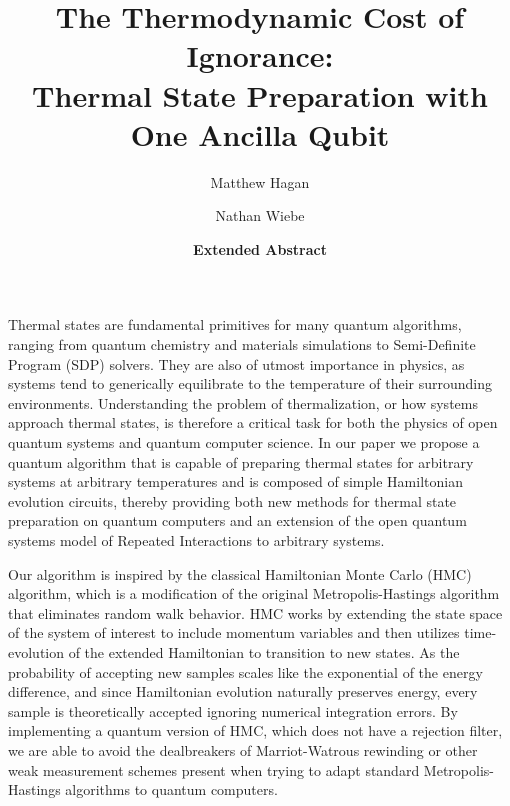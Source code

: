 \documentclass[11pt]{article}
\newcommand{\bigotilde}[1]{\widetilde{O} \left( #1 \right)}
\begin{document}
\title{The Thermodynamic Cost of Ignorance:\\ Thermal State Preparation with One Ancilla Qubit}

\author[1]{Matthew Hagan}
\author[1]{Nathan Wiebe}

\date{\textbf{Extended Abstract}}
\maketitle
Thermal states are fundamental primitives for many quantum algorithms, ranging from quantum chemistry and materials simulations to Semi-Definite Program (SDP) solvers. They are also of utmost importance in physics, as systems tend to generically equilibrate to the temperature of their surrounding environments. Understanding the problem of thermalization, or how systems approach thermal states, is therefore a critical task for both the physics of open quantum systems and quantum computer science. In our paper we propose a quantum algorithm that is capable of preparing thermal states for arbitrary systems at arbitrary temperatures and is composed of simple Hamiltonian evolution circuits, thereby providing both new methods for thermal state preparation on quantum computers and an extension of the open quantum systems model of Repeated Interactions to arbitrary systems. 


Our algorithm is inspired by the classical Hamiltonian Monte Carlo (HMC) algorithm, which is a modification of the original Metropolis-Hastings algorithm that eliminates random walk behavior. HMC works by extending the state space of the system of interest to include momentum variables and then utilizes time-evolution of the extended Hamiltonian to transition to new states. As the probability of accepting new samples scales like the exponential of the energy difference, and since Hamiltonian evolution naturally preserves energy, every sample is theoretically accepted ignoring numerical integration errors. By implementing a quantum version of HMC, which does not have a rejection filter, we are able to avoid the dealbreakers of Marriot-Watrous rewinding \cite{temme2011} or other weak measurement schemes \cite{jiang2024quantummetropolissamplingweak} present when trying to adapt standard Metropolis-Hastings algorithms to quantum computers.
\end{document}

